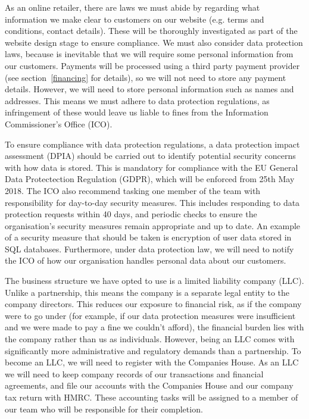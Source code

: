 As an online retailer, there are laws we must abide by regarding what information we make clear to customers on our website (e.g. terms and conditions, contact details). These will be thoroughly investigated as part of the website design stage to ensure compliance. We must also consider data protection laws, because is inevitable that we will require some personal information from our customers. Payments will be processed using a third party payment provider (see section~\ref{financing} for details), so we will not need to store any payment details. However, we will need to store personal information such as names and addresses. This means we must adhere to data protection regulations, as infringement of these would leave us liable to fines from the Information Commissioner's Office (ICO).

To ensure compliance with data protection regulations, a data protection impact assessment (DPIA) should be carried out to identify potential security concerns with how data is stored. This is mandatory for compliance with the EU General Data Protectection Regulation (GDPR), which will be enforced from 25th May 2018. The ICO also recommend tasking one member of the team with responsibility for day-to-day security measures. This includes responding to data protection requests within 40 days, and periodic checks to ensure the organisation's security measures remain appropriate and up to date. An example of a security measure that should be taken is encryption of user data stored in SQL databases. Furthermore, under data protection law, we will need to notify the ICO of how our organisation handles personal data about our customers. 

The business structure we have opted to use is a limited liability company (LLC). Unlike a partnership, this means the company is a separate legal entity to the company directors. This reduces our exposure to financial risk, as if the company were to go under (for example, if our data protection measures were insufficient and we were made to pay a fine we couldn't afford), the financial burden lies with the company rather than us as individuals. However, being an LLC comes with significantly more administrative and regulatory demands than a partnership. To become an LLC, we will need to register with the Companies House. As an LLC we will need to keep company records of our transactions and financial agreements, and file our accounts with the Companies House and our company tax return with HMRC. These accounting tasks will be assigned to a member of our team who will be responsible for their completion.

